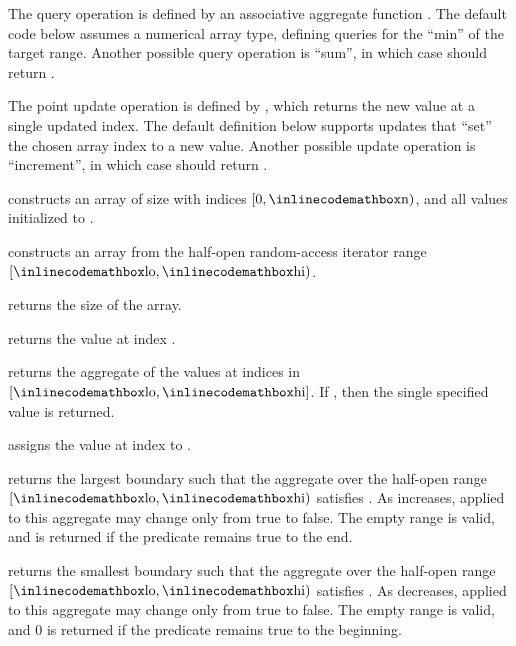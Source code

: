 The query operation is defined by an associative aggregate function . The default code below assumes a numerical array type, defining queries for the ``min'' of the target range. Another possible query operation is ``sum'', in which case  should return .

The point update operation is defined by , which returns the new value at a single updated index. The default definition below supports updates that ``set'' the chosen array index to a new value. Another possible update operation is ``increment'', in which case  should return .

\begin{compactitem}
  \item {} constructs an array of size  with indices $[0, {\inlinecodemath{n}})$, and all values initialized to .
  \item {} constructs an array from the half-open random-access iterator range $[{\inlinecodemath{lo}}, {\inlinecodemath{hi}})$.
  \item {} returns the size of the array.
  \item {} returns the value at index .
  \item {} returns the aggregate of the values at indices in $[{\inlinecodemath{lo}}, {\inlinecodemath{hi}}]$. If , then the single specified value is returned.
  \item {} assigns the value  at index  to .
  \item {} returns the largest boundary  such that the aggregate over the half-open range $[{\inlinecodemath{lo}}, {\inlinecodemath{hi}})$ satisfies . As  increases,  applied to this aggregate may change only from true to false. The empty range is valid, and  is returned if the predicate remains true to the end.
  \item {} returns the smallest boundary  such that the aggregate over the half-open range $[{\inlinecodemath{lo}}, {\inlinecodemath{hi}})$ satisfies . As  decreases,  applied to this aggregate may change only from true to false. The empty range is valid, and $0$ is returned if the predicate remains true to the beginning.
\end{compactitem}

